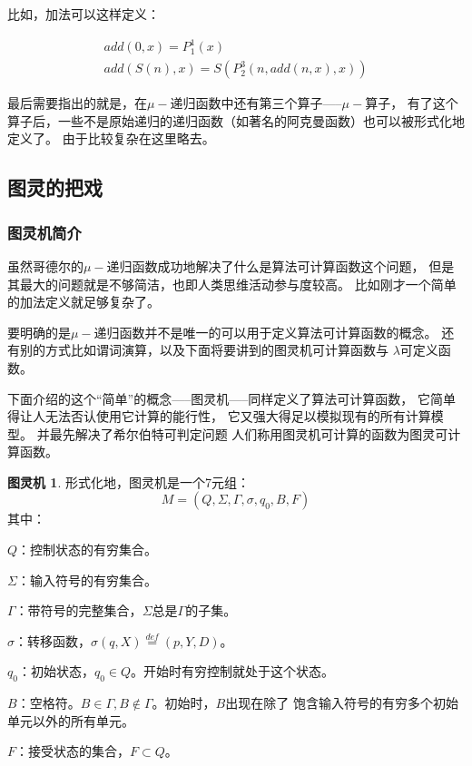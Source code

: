 \documentclass[12pt,a4paper,oneside]{ctexrep}
\theoremstyle{definition}
\newtheorem{tm}{图灵机}
\begin{document}
比如，加法可以这样定义：

\begin{equation}
\begin{split}
add(0,x)=P_1^1(x)\\
add(S(n),x)=S(P_2^3(n,add(n,x),x))
\end{split}
\end{equation}

最后需要指出的就是，在$\mu-$递归函数中还有第三个算子-----$\mu-$算子，
有了这个算子后，一些不是原始递归的递归函数（如著名的阿克曼函数）也可以被形式化地定义了。
由于比较复杂在这里略去。

\subsection{图灵的把戏}

\subsubsection{图灵机简介}
虽然哥德尔的$\mu-$递归函数成功地解决了什么是算法可计算函数这个问题，
但是其最大的问题就是不够简洁，也即人类思维活动参与度较高。
比如刚才一个简单的加法定义就足够复杂了。

要明确的是$\mu-$递归函数并不是唯一的可以用于定义算法可计算函数的概念。
还有别的方式比如谓词演算，以及下面将要讲到的图灵机可计算函数与
$\lambda$可定义函数。

下面介绍的这个“简单”的概念-----图灵机-----同样定义了算法可计算函数，
它简单得让人无法否认使用它计算的能行性，
它又强大得足以模拟现有的所有计算模型。
并最先解决了希尔伯特可判定问题
人们称用图灵机可计算的函数为图灵可计算函数。

\begin{tm}
形式化地，图灵机是一个7元组\cite{ialc}：
\begin{equation}
M=(Q,\Sigma,\Gamma,\sigma,q_0,B,F)
\end{equation}
其中：

$Q$：控制状态的有穷集合。

$\Sigma$：输入符号的有穷集合。

$\Gamma$：带符号的完整集合，$\Sigma$总是$\Gamma$的子集。

$\sigma$：转移函数，$\sigma(q,X) \stackrel{def}{=} (p,Y,D)$。

$q_0$：初始状态，$q_0 \in Q$。开始时有穷控制就处于这个状态。

$B$：空格符。$B \in \Gamma,B \notin \Gamma$。初始时，$B$出现在除了
饱含输入符号的有穷多个初始单元以外的所有单元。

$F$：接受状态的集合，$F \subset Q$。

\end{tm}
\end{document}
